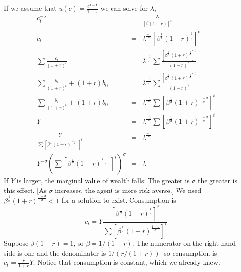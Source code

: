 \documentclass[11pt,pdftex,twoside,letterpaper]{exam}
\begin{document}
If we assume that $u(c) = \frac{c^{1-\sigma}}{1-\sigma} $ we can solve for $\lambda$,
\begin{eqnarray}
  c_t^{-\sigma} &=& \frac{\lambda}{[\beta(1+r)]^t}\\
  c_t &=& \lambda^{\frac{-1}{\sigma}}[\beta^{\frac{1}{\sigma}}(1+r)^{\frac{1}{\sigma}}]^t\\
  \sum \frac{c_t}{(1+r)^t} &=& \lambda^{\frac{-1}{\sigma}}\sum \frac{[\beta^{\frac{1}{\sigma}}(1+r)^{\frac{1}{\sigma}}]^t}{(1+r)^t}\\
  \sum \frac{y_t}{(1+r)^t} + (1+r)b_0 &=& \lambda^{\frac{-1}{\sigma}}\sum \frac{[\beta^{\frac{1}{\sigma}}(1+r)^{\frac{1}{\sigma}}]^t}{(1+r)^t}\\
  \sum \frac{y_t}{(1+r)^t} + (1+r)b_0 &=& \lambda^{\frac{-1}{\sigma}}\sum [\beta^{\frac{1}{\sigma}}(1+r)^{\frac{1-\sigma}{\sigma}}]^t\\
  Y &=& \lambda^{\frac{-1}{\sigma}}\sum [\beta^{\frac{1}{\sigma}}(1+r)^{\frac{1-\sigma}{\sigma}}]^t\\
  \frac{Y}{\sum [\beta^{\frac{1}{\sigma}}(1+r)^{\frac{1-\sigma}{\sigma}}]^t} &=& \lambda^{\frac{-1}{\sigma}}\\
  Y^{-\sigma} \left(\sum [\beta^{\frac{1}{\sigma}}(1+r)^{\frac{1-\sigma}{\sigma}}]^t\right)^{\sigma} &=& \lambda
\end{eqnarray}
If $Y$ is larger, the marginal value of wealth falls; The greater is $\sigma$ the greater is this effect. [As $\sigma$ increases, the agent is more risk averse.] We need $\beta^{\frac{1}{\sigma}}(1+r)^{\frac{1-\sigma}{\sigma}}<1$ for a solution to exist. Consumption is
\begin{equation}\label{eq:cons}
  c_t = Y \frac{[\beta^{\frac{1}{\sigma}}(1+r)^{\frac{1}{\sigma}}]^t}{\sum [\beta^{\frac{1}{\sigma}}(1+r)^{\frac{1-\sigma}{\sigma}}]^t}
\end{equation}
Suppose $\beta(1+r)=1$, so $\beta = 1/(1+r)$. The numerator on the right hand side is one and the denominator is $1/(r/(1+r))$, so consumption is $c_t=\frac{r}{1+r}Y$. Notice that consumption is constant, which we already knew.
\end{document}
